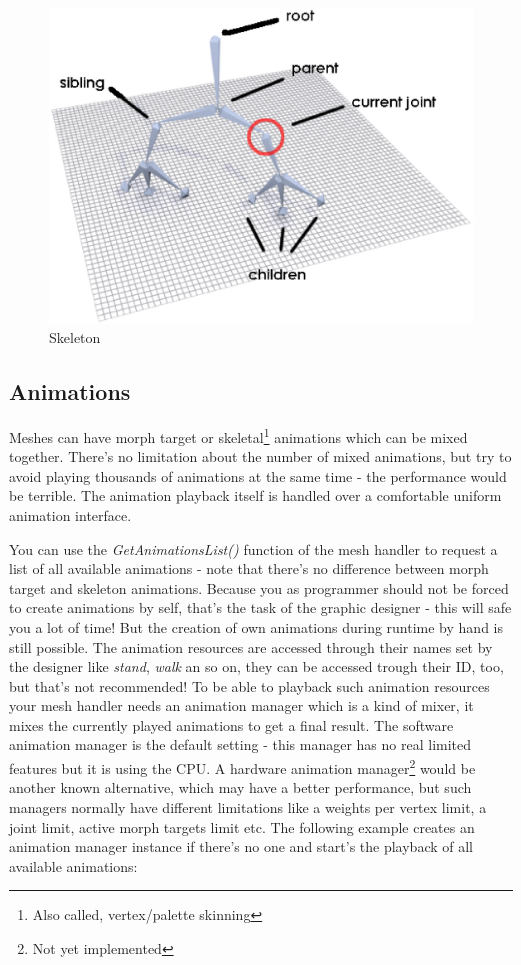 \begin{figure}
  \centering
  \includegraphics[scale=0.5]{pics/Skeleton.eps}
  \caption{Skeleton}
  \label{fig:Skeleton}
\end{figure}




\subsection{Animations}
Meshes can have morph target or skeletal\footnote{Also called, vertex/palette skinning} animations which can be mixed together. There's no limitation about the number of mixed animations, but try to avoid playing thousands of animations at the same time - the performance would be terrible. The animation playback itself is handled over a comfortable uniform animation interface.

You can use the \emph{GetAnimationsList()} function of the mesh handler to request a list of all available animations - note that there's no difference between morph target and skeleton animations. Because you as programmer should not be forced to create animations by self, that's the task of the graphic designer - this will safe you a lot of time! But the creation of own animations during runtime by hand is still possible. The animation resources are accessed through their names set by the designer like \emph{stand}, \emph{walk} an so on, they can be accessed trough their ID, too, but that's not recommended! To be able to playback such animation resources your mesh handler needs an animation manager which is a kind of mixer, it mixes the currently played animations to get a final result. The software animation manager is the default setting - this manager has no real limited features but it is using the CPU. A hardware animation manager\footnote{Not yet implemented} would be another known alternative, which may have a better performance, but such managers normally have different limitations like a weights per vertex limit, a joint limit, active morph targets limit etc. The following example creates an animation manager instance if there's no one and start's the playback of all available animations:

